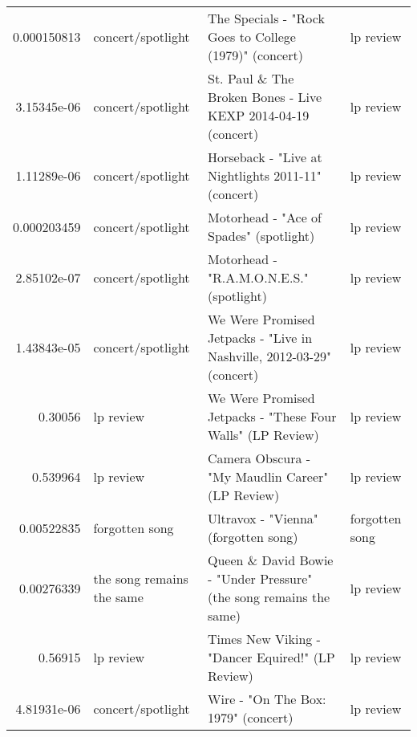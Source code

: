 \documentclass[letterpaper,10pt]{article}
\begin{document}
\begin{table}[H]
\begin{adjustbox}{max width=\linewidth}
\begin{tabular}{rlll}
  0.000150813 & concert/spotlight         & The Specials - "Rock Goes to College (1979)" (concert)                                                       & lp review                 \\
  3.15345e-06 & concert/spotlight         & St. Paul \& The Broken Bones - Live KEXP 2014-04-19 (concert)                                                 & lp review                 \\
  1.11289e-06 & concert/spotlight         & Horseback - "Live at Nightlights 2011-11" (concert)                                                          & lp review                 \\
  0.000203459 & concert/spotlight         & Motorhead - "Ace of Spades" (spotlight)                                                                      & lp review                 \\
  2.85102e-07 & concert/spotlight         & Motorhead - "R.A.M.O.N.E.S." (spotlight)                                                                     & lp review                 \\
  1.43843e-05 & concert/spotlight         & We Were Promised Jetpacks - "Live in Nashville, 2012-03-29" (concert)                                        & lp review                 \\
  0.30056     & lp review                 & We Were Promised Jetpacks - "These Four Walls" (LP Review)                                                   & lp review                 \\
  0.539964    & lp review                 & Camera Obscura - "My Maudlin Career" (LP Review)                                                             & lp review                 \\
  0.00522835  & forgotten song            & Ultravox - "Vienna" (forgotten song)                                                                         & forgotten song            \\
  0.00276339  & the song remains the same & Queen \& David Bowie - "Under Pressure" (the song remains the same)                                           & lp review                 \\
  0.56915     & lp review                 & Times New Viking - "Dancer Equired!" (LP Review)                                                             & lp review                 \\
  4.81931e-06 & concert/spotlight         & Wire - "On The Box: 1979" (concert)                                                                          & lp review                 \\

\end{tabular}
\end{adjustbox}
\end{table}
\end{document}
